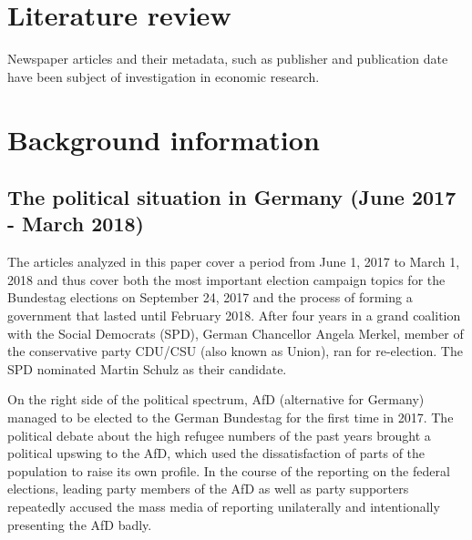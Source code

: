 \documentclass[
]{article}
\begin{document}
\hypertarget{literature-review}{%
\section{Literature review}\label{literature-review}}

Newspaper articles and their metadata, such as publisher and publication
date have been subject of investigation in economic research.

\hypertarget{background-information}{%
\section{Background information}\label{background-information}}

\hypertarget{the-political-situation-in-germany-june-2017---march-2018}{%
\subsection{The political situation in Germany (June 2017 - March
2018)}\label{the-political-situation-in-germany-june-2017---march-2018}}

The articles analyzed in this paper cover a period from June 1, 2017 to
March 1, 2018 and thus cover both the most important election campaign
topics for the Bundestag elections on September 24, 2017 and the process
of forming a government that lasted until February 2018. After four
years in a grand coalition with the Social Democrats (SPD), German
Chancellor Angela Merkel, member of the conservative party CDU/CSU (also
known as Union), ran for re-election. The SPD nominated Martin Schulz as
their candidate.

On the right side of the political spectrum, AfD (alternative for
Germany) managed to be elected to the German Bundestag for the first
time in 2017. The political debate about the high refugee numbers of the
past years brought a political upswing to the AfD, which used the
dissatisfaction of parts of the population to raise its own profile. In
the course of the reporting on the federal elections, leading party
members of the AfD as well as party supporters repeatedly accused the
mass media of reporting unilaterally and intentionally presenting the
AfD badly.
\end{document}
